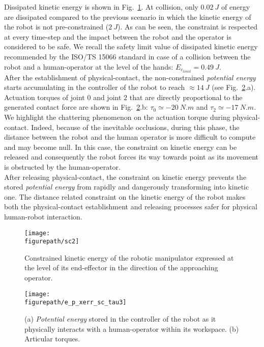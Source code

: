 Dissipated kinetic energy is shown in Fig.~\ref{fig:sc2}. At collision, only $0.02~J$ of energy are dissipated compared to the previous scenario in which the kinetic energy of the robot is not pre-constrained ($2~J$). As can be seen, the constraint is respected at every time-step and the impact between the robot and the operator is considered to be safe. We recall the safety limit value of dissipated kinetic energy recommended by the ISO/TS 15066 \cite{ISO15066PDF} standard in case of a collision between the robot and a human-operator at the level of the hands: $E_{c_{limit}} = 0.49~J$. \\
After the establishment of physical-contact, the non-constrained \textit{potential energy} starts accumulating in the controller of the robot to reach $\approx14~J$ (see Fig.~\ref{fig:e_p_xerr_sc_tau3}.a). Actuation torques of joint $0$ and joint $2$ that are directly proportional to the generated contact force are shown in Fig.~\ref{fig:e_p_xerr_sc_tau3}.b: $\tau_0 \simeq -20~N.m$ and $\tau_2 \simeq -17~N.m$. We highlight the chattering phenomenon on the actuation torque during physical-contact. Indeed, because of the inevitable occlusions, during this phase, the distance between the robot and the human operator is more difficult to compute and may become null. In this case, the constraint on kinetic energy can be released and consequently the robot forces its way towards point  as its movement is obstructed by the human-operator. \\
After releasing physical-contact, the constraint on kinetic energy prevents the stored \textit{potential energy} from rapidly and dangerously transforming into kinetic one. The distance related constraint on the kinetic energy of the robot makes both the physical-contact establishment and releasing processes safer for physical human-robot interaction.  
\begin{figure}[!ht]
\centering
\captionsetup{width=.99\linewidth}\texttt{[image: \\figurepath/sc2]}
\caption{Constrained kinetic energy of the robotic manipulator expressed at the level of its end-effector in the direction of the approaching operator.}
\label{fig:sc2}
\end{figure}
\begin{figure}[!ht]
\centering
\captionsetup{width=.99\linewidth}\texttt{[image: \\figurepath/e\_p\_xerr\_sc\_tau3]}
\caption{(a) \textit{Potential energy} stored in the controller of the robot as it physically interacts with a human-operator within its workspace. (b) Articular torques.}
\label{fig:e_p_xerr_sc_tau3}
\end{figure}
